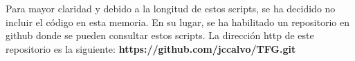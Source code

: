 	Para mayor claridad y debido a la longitud de estos scripts, se ha decidido no incluir el código en esta memoria. En su lugar, se ha habilitado un repositorio en github donde se pueden consultar estos scripts. La dirección http de este repositorio es la siguiente: \textbf{https://github.com/jccalvo/TFG.git}


 \newpage
    


